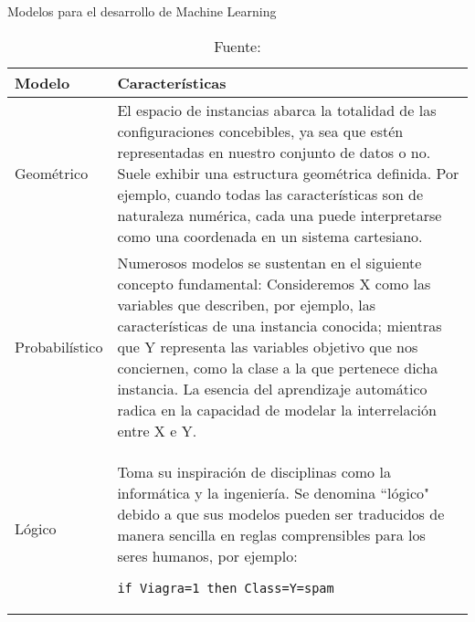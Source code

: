 \begin{table}[htbp]
\centering
\caption{Modelos para el desarrollo de Machine Learning}
\label{tab:modelos}
\begin{tabular}{|l|p{10cm}|}
\hline
\textbf{Modelo} & \textbf{Características} \\
\hline
Geométrico & El espacio de instancias abarca la totalidad de las configuraciones concebibles, ya sea que estén representadas en nuestro conjunto de datos o no. Suele exhibir una estructura geométrica definida. Por ejemplo, cuando todas las características son de naturaleza numérica, cada una puede interpretarse como una coordenada en un sistema cartesiano. \\
\hline
Probabilístico & Numerosos modelos se sustentan en el siguiente concepto fundamental: Consideremos X como las variables que describen, por ejemplo, las características de una instancia conocida; mientras que Y representa las variables objetivo que nos conciernen, como la clase a la que pertenece dicha instancia. La esencia del aprendizaje automático radica en la capacidad de modelar la interrelación entre X e Y. \\
\hline
Lógico & Toma su inspiración de disciplinas como la informática y la ingeniería. Se denomina ``lógico" debido a que sus modelos pueden ser traducidos de manera sencilla en reglas comprensibles para los seres humanos, por ejemplo: \begin{verbatim}
if Viagra=1 then Class=Y=spam
\end{verbatim} \\
\hline
\end{tabular}
\caption*{\footnotesize Fuente: \citet[p.43]{salamanca2021}}
\end{table}

